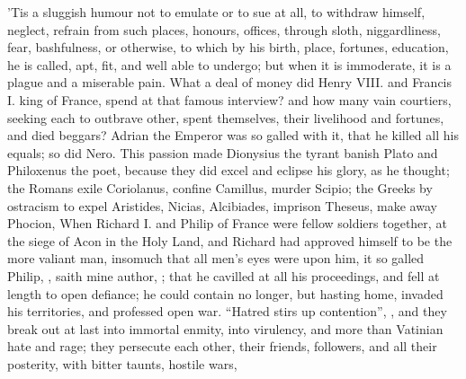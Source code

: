 
'Tis a sluggish humour not to emulate or to sue at all, to withdraw himself,
neglect, refrain from such places, honours, offices, through sloth,
niggardliness, fear, bashfulness, or otherwise, to which by his birth, place,
fortunes, education, he is called, apt, fit, and well able to undergo; but when
it is immoderate, it is a plague and a miserable pain. What a deal of money did
Henry VIII. and Francis I. king of France, spend at that
famous interview? and how many vain courtiers, seeking
each to outbrave other, spent themselves, their livelihood and fortunes, and
died beggars? Adrian the Emperor was so galled with it,
that he killed all his equals; so did Nero. This passion made
Dionysius the tyrant banish Plato and Philoxenus the poet,
because they did excel and eclipse his glory, as he thought; the Romans exile
Coriolanus, confine Camillus, murder Scipio; the Greeks by ostracism to expel
Aristides, Nicias, Alcibiades, imprison Theseus, make away Phocion, \etc{} When
Richard I. and Philip of France were fellow soldiers together, at the siege of
Acon in the Holy Land, and Richard had approved himself to be the more valiant
man, insomuch that all men's eyes were upon him, it so galled Philip,
, saith mine author,
;
that he cavilled at all his proceedings, and fell at length to open defiance;
he could contain no longer, but hasting home, invaded his territories, and
professed open war. \enquote{Hatred stirs up contention}, ,
and they break out at last into immortal enmity, into virulency, and more than
Vatinian hate and rage; they persecute each other, their
friends, followers, and all their posterity, with bitter taunts, hostile wars,
